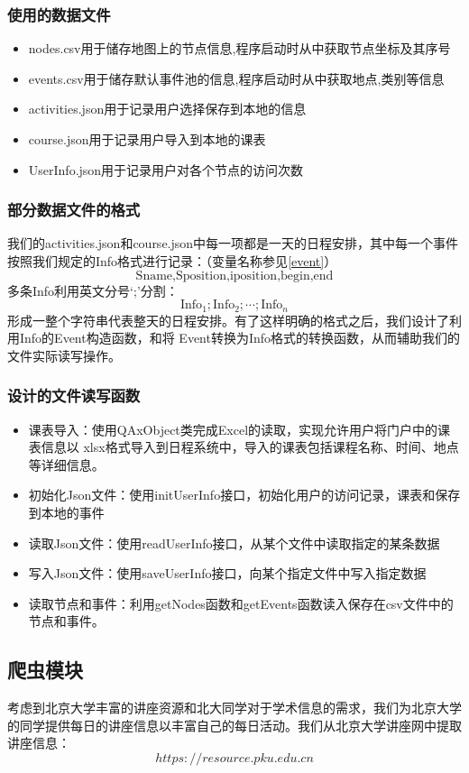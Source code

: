 \documentclass[11pt,hyperref,a4paper,UTF8]{ctexart}
\begin{document}
\begin{CJK}{UTF8}{gkai}
\subsubsection{使用的数据文件}
\begin{itemize}
    \item nodes.csv用于储存地图上的节点信息,程序启动时从中获取节点坐标及其序号
    \item events.csv用于储存默认事件池的信息,程序启动时从中获取地点,类别等信息
    \item activities.json用于记录用户选择保存到本地的信息
    \item course.json用于记录用户导入到本地的课表
    \item UserInfo.json用于记录用户对各个节点的访问次数
\end{itemize}

\subsubsection{部分数据文件的格式}
我们的activities.json和course.json中每一项都是一天的日程安排，其中每一个事件按照我们规定的Info格式进行记录：（变量名称参见\ref{event}）
\[\text{Sname,Sposition,iposition,begin,end}\]
多条Info利用英文分号`;'分割：
\[\text{Info}_1 ; \text{Info}_2; \cdots ; \text{Info}_n\]
形成一整个字符串代表整天的日程安排。有了这样明确的格式之后，我们设计了利用Info的Event构造函数，和将 Event转换为Info格式的转换函数，从而辅助我们的文件实际读写操作。

\subsubsection{设计的文件读写函数}
\begin{itemize}
    \item 课表导入：使用QAxObject类完成Excel的读取，实现允许用户将门户中的课表信息以 xlsx格式导入到日程系统中，导入的课表包括课程名称、时间、地点等详细信息。
    \item 初始化Json文件：使用initUserInfo接口，初始化用户的访问记录，课表和保存到本地的事件
    \item 读取Json文件：使用readUserInfo接口，从某个文件中读取指定的某条数据
    \item 写入Json文件：使用saveUserInfo接口，向某个指定文件中写入指定数据
    \item 读取节点和事件：利用getNodes函数和getEvents函数读入保存在csv文件中的节点和事件。
\end{itemize}

\subsection{爬虫模块}
考虑到北京大学丰富的讲座资源和北大同学对于学术信息的需求，我们为北京大学的同学提供每日的讲座信息以丰富自己的每日活动。我们从北京大学讲座网中提取讲座信息：
\[https://resource.pku.edu.cn\]


\end{CJK}
\end{document}
